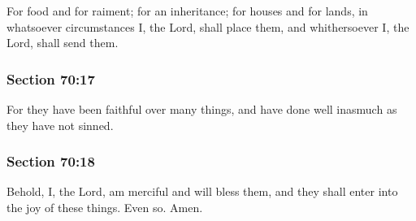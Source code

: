 		For food and for raiment; for an inheritance; for houses and for lands, in whatsoever circumstances I, the Lord, shall place them, and whithersoever I, the Lord, shall send them.


	\subsubsection{Section 70:17} %
		\label{DC70-17}

		For they have been faithful over many things, and have done well inasmuch as they have not sinned.


	\subsubsection{Section 70:18} %
		\label{DC70-18}

		Behold, I, the Lord, am merciful and will bless them, and they shall enter into the joy of these things.  Even so.  Amen.

